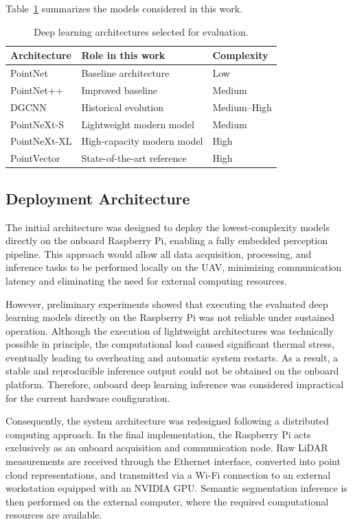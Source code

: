 Table~\ref{tab:selected_models} summarizes the models considered in this work.

\begin{table}[H]
\centering
\caption{Deep learning architectures selected for evaluation.}
\label{tab:selected_models}
\begin{tabular}{|l|l|l|}
\hline
\textbf{Architecture} & \textbf{Role in this work} & \textbf{Complexity} \\
\hline
PointNet & Baseline architecture & Low \\
\hline
PointNet++ & Improved baseline & Medium \\
\hline
DGCNN & Historical evolution & Medium--High \\
\hline
PointNeXt-S & Lightweight modern model & Medium \\
\hline
PointNeXt-XL & High-capacity modern model & High \\
\hline
PointVector & State-of-the-art reference & High \\
\hline
\end{tabular}
\end{table}

\subsection{Deployment Architecture}
\label{subsec:deployment_architecture}

The initial architecture was designed to deploy the lowest-complexity models directly on the onboard Raspberry Pi, enabling a fully embedded perception pipeline. This approach would allow all data acquisition, processing, and inference tasks to be performed locally on the UAV, minimizing communication latency and eliminating the need for external computing resources.

However, preliminary experiments showed that executing the evaluated deep learning models directly on the Raspberry Pi was not reliable under sustained operation. Although the execution of lightweight architectures was technically possible in principle, the computational load caused significant thermal stress, eventually leading to overheating and automatic system restarts. As a result, a stable and reproducible inference output could not be obtained on the onboard platform. Therefore, onboard deep learning inference was considered impractical for the current hardware configuration.

Consequently, the system architecture was redesigned following a distributed computing approach. In the final implementation, the Raspberry Pi acts exclusively as an onboard acquisition and communication node. Raw LiDAR measurements are received through the Ethernet interface, converted into point cloud representations, and transmitted via a Wi-Fi connection to an external workstation equipped with an NVIDIA GPU. Semantic segmentation inference is then performed on the external computer, where the required computational resources are available.

